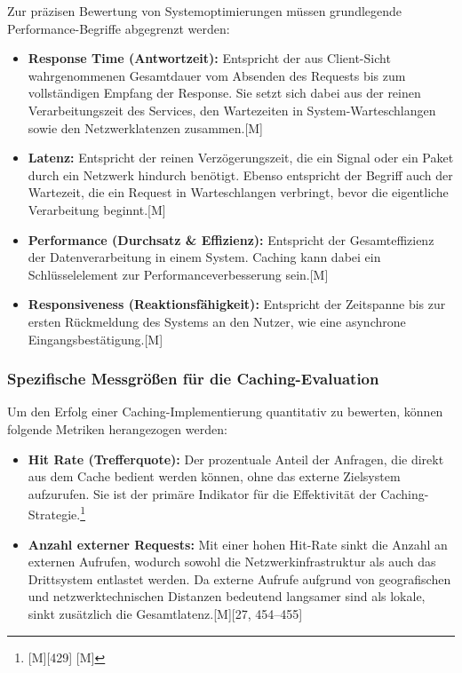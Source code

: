 Zur präzisen Bewertung von Systemoptimierungen müssen grundlegende Performance-Begriffe abgegrenzt werden:
\begin{itemize}
    \item \textbf{Response Time (Antwortzeit):} Entspricht der aus Client-Sicht wahrgenommenen Gesamtdauer vom Absenden des Requests bis zum vollständigen Empfang der Response. Sie setzt sich dabei aus der reinen Verarbeitungszeit des Services, den Wartezeiten in System-Warteschlangen sowie den Netzwerklatenzen zusammen.[M] %
    \item \textbf{Latenz:} Entspricht der reinen Verzögerungszeit, die ein Signal oder ein Paket durch ein Netzwerk hindurch benötigt. Ebenso entspricht der Begriff auch der Wartezeit, die ein Request in Warteschlangen verbringt, bevor die eigentliche Verarbeitung beginnt.[M] %
    \item \textbf{Performance (Durchsatz \& Effizienz):} Entspricht der Gesamteffizienz der Datenverarbeitung in einem System. Caching kann dabei ein Schlüsselelement zur Performanceverbesserung sein.[M] %
    \item \textbf{Responsiveness (Reaktionsfähigkeit):} Entspricht der Zeitspanne bis zur ersten Rückmeldung des Systems an den Nutzer, wie eine asynchrone Eingangsbestätigung.[M] %
\end{itemize}

\subsubsection{Spezifische Messgrößen für die Caching-Evaluation}

Um den Erfolg einer Caching-Implementierung quantitativ zu bewerten, können folgende Metriken herangezogen werden:

\begin{itemize}
    \item \textbf{Hit Rate (Trefferquote):} Der prozentuale Anteil der Anfragen, die direkt aus dem Cache bedient werden können, ohne das externe Zielsystem aufzurufen. Sie ist der primäre Indikator für die Effektivität der Caching-Strategie.\footnote{[M][429] [M]} %
    \item \textbf{Anzahl externer Requests:} Mit einer hohen Hit-Rate sinkt die Anzahl an externen Aufrufen, wodurch sowohl die Netzwerkinfrastruktur als auch das Drittsystem entlastet werden. Da externe Aufrufe aufgrund von geografischen und netzwerktechnischen Distanzen bedeutend langsamer sind als lokale, sinkt zusätzlich die Gesamtlatenz.[M][27, 454--455]
\end{itemize}


